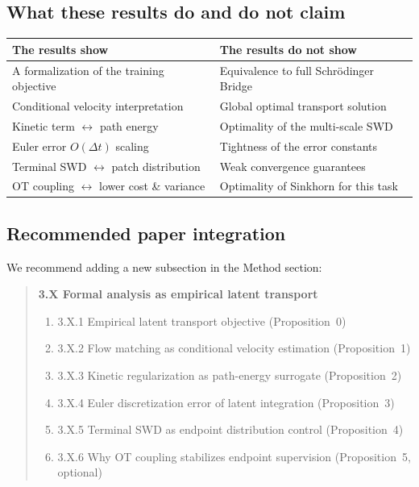 \documentclass[letterpaper]{article}
\begin{document}
\subsection{What these results do and do not claim}

\begin{tabular}{|l|l|}
\hline
\textbf{The results show} & \textbf{The results do not show} \\
\hline
A formalization of the training objective & Equivalence to full Schr\"odinger Bridge \\
Conditional velocity interpretation & Global optimal transport solution \\
Kinetic term $\leftrightarrow$ path energy & Optimality of the multi-scale SWD \\
Euler error $O(\Delta t)$ scaling & Tightness of the error constants \\
Terminal SWD $\leftrightarrow$ patch distribution & Weak convergence guarantees \\
OT coupling $\leftrightarrow$ lower cost \& variance & Optimality of Sinkhorn for this task \\
\hline
\end{tabular}

\subsection{Recommended paper integration}

We recommend adding a new subsection in the Method section:

\begin{quote}
\textbf{3.X Formal analysis as empirical latent transport}
\begin{enumerate}[nosep]
    \item 3.X.1 Empirical latent transport objective (Proposition~0)
    \item 3.X.2 Flow matching as conditional velocity estimation (Proposition~1)
    \item 3.X.3 Kinetic regularization as path-energy surrogate (Proposition~2)
    \item 3.X.4 Euler discretization error of latent integration (Proposition~3)
    \item 3.X.5 Terminal SWD as endpoint distribution control (Proposition~4)
    \item 3.X.6 Why OT coupling stabilizes endpoint supervision (Proposition~5, optional)
\end{enumerate}
\end{quote}
\end{document}
